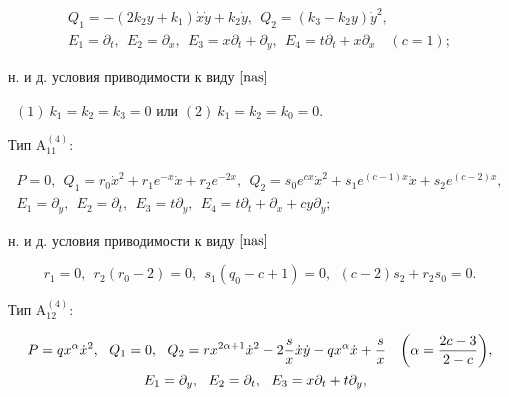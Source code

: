 \begin{thms}
\begin{gather*}
Q_1= -(2{k_2}y + { k_1}){ \Dot x}{ \Dot y} + { k_2}{ \Dot y},\ \


Q_2=({ k_3} - { k_2}y){ \Dot y}^{2}, \\


E_1=\partial_t,\ \ E_2=\partial_ x,\ \


E_3=x\partial_t+\partial_y,\ \


E_4=t\partial_t+x\partial_x\quad (c=1);


\end{gather*}


н. и д. условия приводимости к виду $\eqref{nas}$


\ $(1)\ k_1=k_2=k_3=0$ или $(2) \ k_1=k_2=k_0=0$.





Тип $\mathrm{A^{(4)}_{11}}{:}$


\begin{gather*}


P=0,\ \ Q_1=r_0\Dot x^2+r_1e^{-x}\Dot x+r_2e^{-2x},\ \


Q_2=s_0e^{cx}\Dot x^2+s_1e^{(c-1)x}\Dot x+s_2e^{(c-2)x}, \\


E_1=\partial_y,\ \ E_2=\partial_ t,\ \


E_3=t\partial_y,\ \ E_4=t\partial_t+\partial_x+cy\partial_y;


\end{gather*}


н. и д. условия приводимости к виду $\eqref{nas}$


$$


r_1=0, \ \ r_2(r_0-2)=0, \ \ s_1(q_0-c+1)=0,\ \ (c-2)s_2+r_2s_0=0.


$$





Тип $\mathrm{A^{(4)}_{12}}{:}$


\begin{gather*}


P=qx^\alpha\Dot x ^2,\ \ Q_1=0,\ \


Q_2=rx^{2\alpha+1}\Dot x^2


-2\frac{s}{x}\Dot x\Dot y-


qx^{\alpha}\Dot x+\frac{s}{x}


\quad \bigg(\alpha={2c-3\over 2-c}\bigg), \\


E_1=\partial_y,\ \ E_2=\partial_ t,\ \


E_3=x\partial_t+t\partial_y,\ \



\end{gather*}
\end{thms}
